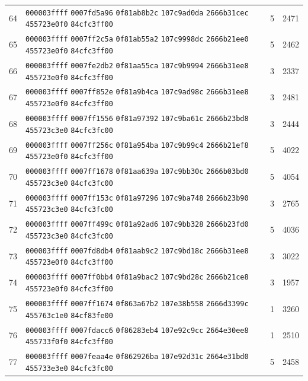 \begin{longtable}{@{}r p{12cm} r r@{}}
64 & \texttt{000003ffff} \texttt{0007fd5a96} \texttt{0f81ab8b2c} \texttt{107c9ad0da} \texttt{2666b31cec} \texttt{455723e0f0} \texttt{84cfc3ff00} & 5 & 2471 \\
65 & \texttt{000003ffff} \texttt{0007ff2c5a} \texttt{0f81ab55a2} \texttt{107c9998dc} \texttt{2666b21ee0} \texttt{455723e0f0} \texttt{84cfc3ff00} & 5 & 2462 \\
66 & \texttt{000003ffff} \texttt{0007fe2db2} \texttt{0f81aa55ca} \texttt{107c9b9994} \texttt{2666b31ee8} \texttt{455723e0f0} \texttt{84cfc3ff00} & 3 & 2337 \\
67 & \texttt{000003ffff} \texttt{0007ff852e} \texttt{0f81a9b4ca} \texttt{107c9ad98c} \texttt{2666b31ee8} \texttt{455723e0f0} \texttt{84cfc3ff00} & 3 & 2481 \\
68 & \texttt{000003ffff} \texttt{0007ff1556} \texttt{0f81a97392} \texttt{107c9ba61c} \texttt{2666b23bd8} \texttt{455723c3e0} \texttt{84cfc3fc00} & 3 & 2444 \\
69 & \texttt{000003ffff} \texttt{0007ff256c} \texttt{0f81a954ba} \texttt{107c9b99c4} \texttt{2666b21ef8} \texttt{455723e0f0} \texttt{84cfc3ff00} & 5 & 4022 \\
70 & \texttt{000003ffff} \texttt{0007ff1678} \texttt{0f81aa639a} \texttt{107c9bb30c} \texttt{2666b03bd0} \texttt{455723c3e0} \texttt{84cfc3fc00} & 5 & 4054 \\
71 & \texttt{000003ffff} \texttt{0007ff153c} \texttt{0f81a97296} \texttt{107c9ba748} \texttt{2666b23b90} \texttt{455723c3e0} \texttt{84cfc3fc00} & 3 & 2765 \\
72 & \texttt{000003ffff} \texttt{0007ff499c} \texttt{0f81a92ad6} \texttt{107c9bb328} \texttt{2666b23fd0} \texttt{455723c3e0} \texttt{84cfc3fc00} & 5 & 4036 \\
73 & \texttt{000003ffff} \texttt{0007fd8db4} \texttt{0f81aab9c2} \texttt{107c9bd18c} \texttt{2666b31ee8} \texttt{455723e0f0} \texttt{84cfc3ff00} & 3 & 3022 \\
74 & \texttt{000003ffff} \texttt{0007ff0bb4} \texttt{0f81a9bac2} \texttt{107c9bd28c} \texttt{2666b21ce8} \texttt{455723e0f0} \texttt{84cfc3ff00} & 3 & 1957 \\
75 & \texttt{000003ffff} \texttt{0007ff1674} \texttt{0f863a67b2} \texttt{107e38b558} \texttt{2666d3399c} \texttt{455763c1e0} \texttt{84cf83fe00} & 1 & 3260 \\
76 & \texttt{000003ffff} \texttt{0007fdacc6} \texttt{0f86283eb4} \texttt{107e92c9cc} \texttt{2664e30ee8} \texttt{455733f0f0} \texttt{84cfc3ff00} & 1 & 2510 \\
77 & \texttt{000003ffff} \texttt{0007feaa4e} \texttt{0f862926ba} \texttt{107e92d31c} \texttt{2664e31bd0} \texttt{455733e3e0} \texttt{84cfc3fc00} & 5 & 2458 \\

\end{longtable}
